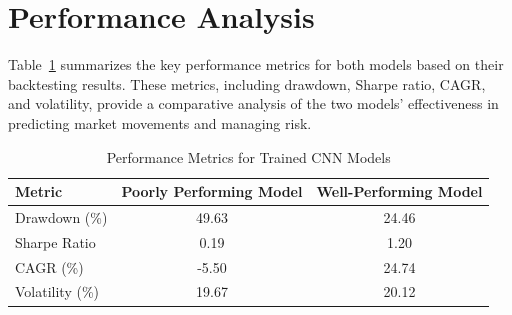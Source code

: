 \section{Performance Analysis}

Table~\ref{tab:performance_metrics} summarizes the key performance metrics for both models based on their backtesting results. These metrics, including drawdown, Sharpe ratio, CAGR, and volatility, provide a comparative analysis of the two models’ effectiveness in predicting market movements and managing risk.

\begin{table}[h!]
    \centering
    \caption{Performance Metrics for Trained CNN Models}
    \label{tab:performance_metrics}
    \begin{tabular}{lcc}
        \toprule
        \textbf{Metric} & \textbf{Poorly Performing Model} & \textbf{Well-Performing Model} \\
        \midrule
        Drawdown (\%) & 49.63 & 24.46 \\
        Sharpe Ratio & 0.19 & 1.20 \\
        CAGR (\%) & -5.50 & 24.74 \\
        Volatility (\%) & 19.67 & 20.12 \\
        \bottomrule
    \end{tabular}
\end{table}
